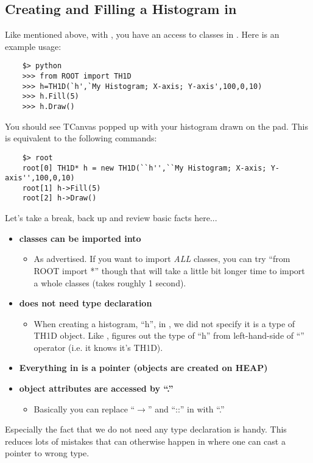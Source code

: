 \subsection{Creating and Filling a Histogram in \PyROOT}
Like mentioned above, with \PyROOT, you have an access to \ROOT classes in \python.
Here is an example usage:
\begin{lstlisting}
    $> python
    >>> from ROOT import TH1D
    >>> h=TH1D(`h',`My Histogram; X-axis; Y-axis',100,0,10)
    >>> h.Fill(5)
    >>> h.Draw()
\end{lstlisting}
You should see {\ttfamily TCanvas} popped up with your histogram drawn on the pad.
This is equivalent to the following \CINT commands:
\begin{lstlisting}
    $> root
    root[0] TH1D* h = new TH1D(``h'',``My Histogram; X-axis; Y-axis'',100,0,10)
    root[1] h->Fill(5)
    root[2] h->Draw()
\end{lstlisting}
Let's take a break, back up and review basic facts here...
\begin{itemize}

    \item {\bf \ROOT classes can be imported into \python}
      \begin{itemize}
        \item As advertised. If you want to import {\it ALL} \ROOT classes, you can try
          ``from ROOT import *'' though that will take a little bit longer time to import
          a whole \ROOT classes (takes roughly 1 second).
      \end{itemize}

    \item {\bf \python does not need type declaration}
      \begin{itemize}
        \item When creating a histogram, ``{\ttfamily h}'', in \python, we did not specify it is
          a type of TH1D object. Like , \python figures out the type of 
          ``{\ttfamily h}'' from left-hand-side of ``\ttfamily{=}'' operator (i.e. it knows it's TH1D).
      \end{itemize}

    \item {\bf Everything in \python is a pointer (objects are created on {\ttfamily HEAP})}

    \item {\bf \python object attributes are accessed by ``.''}
      \begin{itemize}
        \item Basically you can replace ``$\rightarrow$'' and ``::'' in \CPP with ``.''
      \end{itemize}

\end{itemize}
Especially the fact that we do not need any type declaration is handy. This reduces lots of mistakes
that can otherwise happen in \CINT where one can cast a pointer to wrong type.

